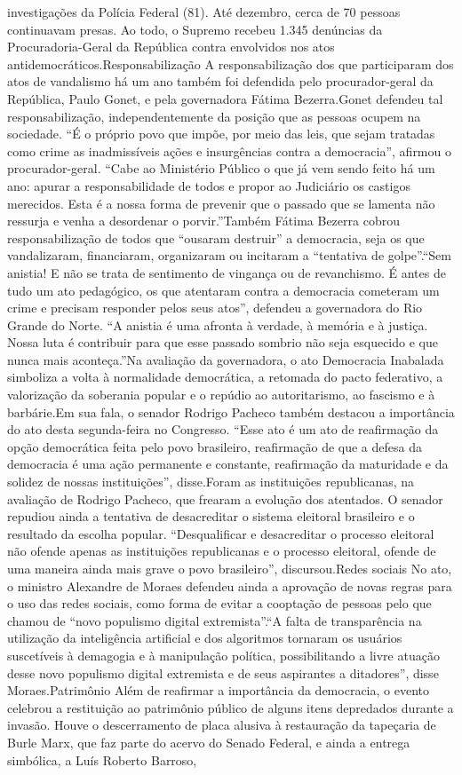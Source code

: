 \documentclass[
   article,       
   12pt,          
   oneside,       
   a4paper,       
   english,       
   brazil,        
   sumario=tradicional
   ]{abntex2}
\begin{document}
investigações da Polícia Federal (81). Até dezembro, cerca de 70 pessoas continuavam presas. Ao todo, o Supremo recebeu 1.345 denúncias da Procuradoria-Geral da República contra envolvidos nos atos antidemocráticos.Responsabilização A responsabilização dos que participaram dos atos de vandalismo há um ano também foi defendida pelo procurador-geral da República, Paulo Gonet, e pela governadora Fátima Bezerra.Gonet defendeu tal responsabilização, independentemente da posição que as pessoas ocupem na sociedade. “É o próprio povo que impõe, por meio das leis, que sejam tratadas como crime as inadmissíveis ações e insurgências contra a democracia”, afirmou o procurador-geral. “Cabe ao Ministério Público o que já vem sendo feito há um ano: apurar a responsabilidade de todos e propor ao Judiciário os castigos merecidos. Esta é a nossa forma de prevenir que o passado que se lamenta não ressurja e venha a desordenar o porvir.”Também Fátima Bezerra cobrou responsabilização de todos que “ousaram destruir” a democracia, seja os que vandalizaram, financiaram, organizaram ou incitaram a “tentativa de golpe”.“Sem anistia! E não se trata de sentimento de vingança ou de revanchismo. É antes de tudo um ato pedagógico, os que atentaram contra a democracia cometeram um crime e precisam responder pelos seus atos”, defendeu a governadora do Rio Grande do Norte. “A anistia é uma afronta à verdade, à memória e à justiça. Nossa luta é contribuir para que esse passado sombrio não seja esquecido e que nunca mais aconteça.”Na avaliação da governadora, o ato Democracia Inabalada simboliza a volta à normalidade democrática, a retomada do pacto federativo, a valorização da soberania popular e o repúdio ao autoritarismo, ao fascismo e à barbárie.Em sua fala, o senador Rodrigo Pacheco também destacou a importância do ato desta segunda-feira no Congresso. “Esse ato é um ato de reafirmação da opção democrática feita pelo povo brasileiro, reafirmação de que a defesa da democracia é uma ação permanente e constante, reafirmação da maturidade e da solidez de nossas instituições”, disse.Foram as instituições republicanas, na avaliação de Rodrigo Pacheco, que frearam a evolução dos atentados. O senador repudiou ainda a tentativa de desacreditar o sistema eleitoral brasileiro e o resultado da escolha popular. “Desqualificar e desacreditar o processo eleitoral não ofende apenas as instituições republicanas e o processo eleitoral, ofende de uma maneira ainda mais grave o povo brasileiro”, discursou.Redes sociais No ato, o ministro Alexandre de Moraes defendeu ainda a aprovação de novas regras para o uso das redes sociais, como forma de evitar a cooptação de pessoas pelo que chamou de “novo populismo digital extremista”.“A falta de transparência na utilização da inteligência artificial e dos algoritmos tornaram os usuários suscetíveis à demagogia e à manipulação política, possibilitando a livre atuação desse novo populismo digital extremista e de seus aspirantes a ditadores”, disse Moraes.Patrimônio Além de reafirmar a importância da democracia, o evento celebrou a restituição ao patrimônio público de alguns itens depredados durante a invasão. Houve o descerramento de placa alusiva à restauração da tapeçaria de Burle Marx, que faz parte do acervo do Senado Federal, e ainda a entrega simbólica, a Luís Roberto Barroso, 
\end{document}
